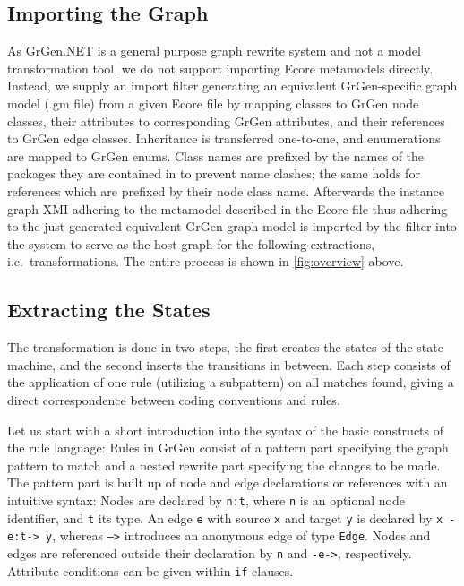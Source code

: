 \documentclass[copyright]{eptcs}
\begin{document}
\subsection{Importing the Graph}

As GrGen.NET is a general purpose graph rewrite system and not a model transformation tool,
we do not support importing Ecore metamodels directly.
Instead, we supply an import filter generating an equivalent GrGen-specific graph model (.gm file) from a given Ecore file
by mapping classes to GrGen node classes,
their attributes to corresponding GrGen attributes,
and their references to GrGen edge classes.
Inheritance is transferred one-to-one, and enumerations are mapped to GrGen enums.
Class names are prefixed by the names of the packages they are contained in to prevent name clashes;
the same holds for references which are prefixed by their node class name.
Afterwards the instance graph XMI adhering to the metamodel described in the Ecore file thus adhering to the just generated equivalent GrGen graph model is imported by the filter into the system to serve as the host graph for the following extractions, i.e.\ transformations.
The entire process is shown in \autoref{fig:overview} above.


\subsection{Extracting the States}

The transformation is done in two steps, the first creates the states of the state machine, and the second inserts the transitions in between.
Each step consists of the application of one rule (utilizing a subpattern) on all matches found, giving a direct correspondence between coding conventions and rules.

Let us start with a short introduction into the syntax of the basic constructs of the rule language:
Rules in GrGen consist of a pattern part specifying the graph pattern to match and a nested rewrite part specifying the changes to be made.
The pattern part is built up of node and edge declarations or references with an intuitive syntax:
Nodes are declared by \texttt{n:t}, where \texttt{n} is an optional node identifier, and \texttt{t} its type.
An edge \texttt{e} with source \texttt{x} and target \texttt{y} is declared by \texttt{x -e:t-> y}, whereas \texttt{-->} introduces an anonymous edge of type \texttt{Edge}.
Nodes and edges are referenced outside their declaration by \texttt{n} and \texttt{-e->}, respectively.
Attribute conditions can be given within \texttt{if}-clauses.
\end{document}
